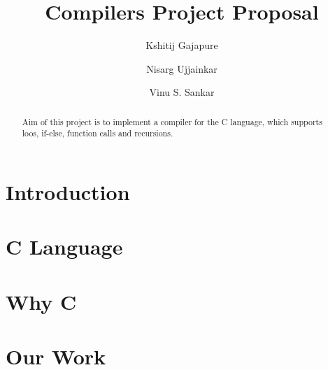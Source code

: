 \documentclass{clv3}
\author{Kshitij Gajapure}
\affil{16110055}
\author{Nisarg Ujjainkar}
\affil{16110102}
\author{Vinu S. Sankar}
\affil{16110xxx}
\title{Compilers Project Proposal}
\begin{document}
    \maketitle  
    \begin{abstract}
        Aim of this project is to implement a compiler for the 
        C language, which supports loos, if-else, function calls 
        and recursions.
    \end{abstract}
    \section{Introduction}
    
    \section{C Language}
    
    \section{Why C}
    
    \section{Our Work}
    
\end{document}
